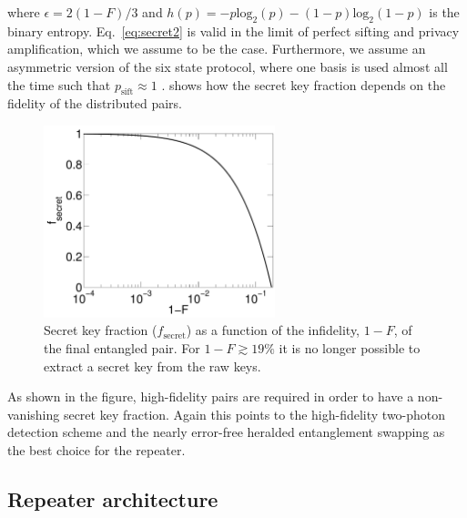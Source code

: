 where $\epsilon=2(1-F)/3$ and
$h(p)=-p\text{log}_{2}(p)-(1-p)\text{log}_{2}(1-p)$ is the binary entropy.
Eq.~\eqref{eq:secret2} is valid in the limit of perfect sifting and privacy
amplification, which we assume to be the case. Furthermore, we assume an
asymmetric version of the six state protocol, where one basis is used almost all
the time such that $p_{\text{sift}}\approx1$ \cite{scarani}.
 shows how the secret key fraction depends on the fidelity
of the distributed pairs.
\begin{figure} 
\centering
\includegraphics[width=0.6\textwidth]{./figs_Borregaard_PRA2015/figure5}
\caption[Secret key fraction]{Secret key fraction ($f_{\text{secret}}$) as a
function of the infidelity, $1-F$, of the final entangled pair. For
$1-F\gtrsim19 \%$ it is no longer possible to extract a secret key from the raw
keys.}
\label{fig:figure5}
\end{figure} 
As shown in the figure, high-fidelity pairs are required in order to have a
non-vanishing secret key fraction. Again this points to the high-fidelity
two-photon detection scheme and the nearly error-free heralded entanglement
swapping as the best choice for the repeater.

\subsection{Repeater architecture}

